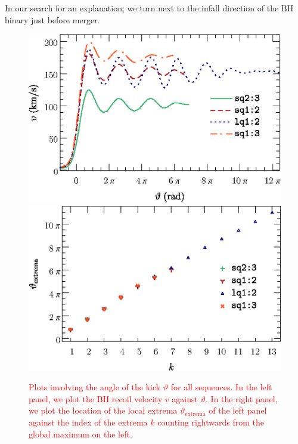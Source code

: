 \documentclass[floats,floatfix,showpacs,amssymb,prd,twocolumn,superscriptaddress,nofootinbib,nolongbibliography,reprint]{revtex4-2}
\newcounter{count}
\newcommand{\new}[1]{{\textcolor{red}{ #1} }}
\begin{document}
In our search for an explanation, we turn next to the infall direction
of the BH binary just before merger.
%
%
\begin{figure}[t]
    \subfloat%
    {
    \includegraphics[width=\columnwidth]{kick-theta.eps}
    \label{fig:kick-theta}
    }
    \hfill
    \subfloat%
    {
    \includegraphics[width=\columnwidth]{theta-extrema.eps}
    \label{fig:theta-extrema}
    }
    \caption{\new{
    Plots involving the angle of the kick $\vartheta$ for 
    all sequences. In the left panel, we plot the BH recoil 
    velocity $v$ against $\vartheta$. In the right panel, we plot the location of the local extrema $\vartheta_\text{extrema}$ 
    of the left panel against the index of the extrema $k$ counting rightwards from
    the global maximum on the left.
    }}
    \label{fig:theta-plots}
\end{figure}
\end{document}
